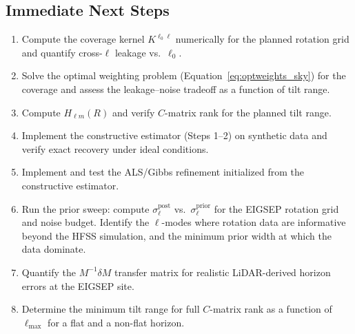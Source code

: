 \documentclass{aastex631}
\newcommand{\Hlm}{H_{\ell m}}
\newcommand{\lmax}{\ell_\mathrm{max}}
\theoremstyle{plain}
\theoremstyle{remark}
\begin{document}
\subsection{Immediate Next Steps}

\begin{enumerate}
  \item Compute the coverage kernel $K^{\ell_0\ell}$ numerically
    for the planned rotation grid and quantify cross-$\ell$ leakage
    vs.\ $\ell_0$.
  \item Solve the optimal weighting problem
    (Equation~\ref{eq:optweights_sky}) for the coverage and assess
    the leakage--noise tradeoff as a function of tilt range.
  \item Compute $\Hlm(R)$ and verify $C$-matrix rank for the
    planned tilt range.
  \item Implement the constructive estimator (Steps 1--2) on
    synthetic data and verify exact recovery under ideal conditions.
  \item Implement and test the ALS/Gibbs refinement initialized from
    the constructive estimator.
  \item Run the prior sweep: compute $\sigma^\mathrm{post}_\ell$
    vs.\ $\sigma^\mathrm{prior}_\ell$ for the EIGSEP rotation grid
    and noise budget.
    Identify the $\ell$-modes where rotation data are informative
    beyond the HFSS simulation, and the minimum prior width at
    which the data dominate.
  \item Quantify the $M^{-1}\delta M$ transfer matrix for realistic
    LiDAR-derived horizon errors at the EIGSEP site.
  \item Determine the minimum tilt range for full $C$-matrix rank
    as a function of $\lmax$ for a flat and a non-flat horizon.
\end{enumerate}

{}

\end{document}
